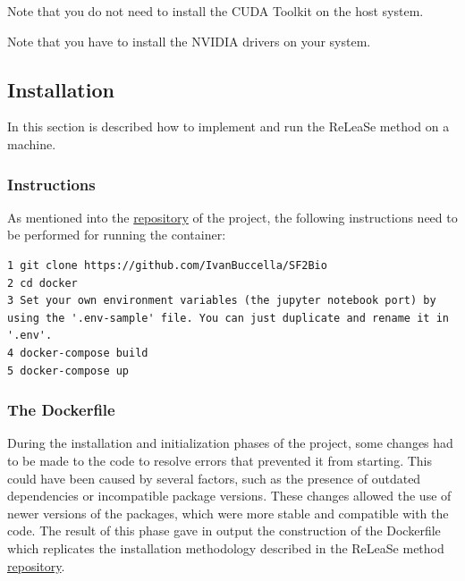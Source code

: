 \documentclass[a4paper]{article}
\begin{document}
\begin{flushleft}
Note that you do not need to install the CUDA Toolkit on the host system.

Note that you have to install the NVIDIA drivers on your system.
\end{flushleft}


\subsection{Installation}\label{sec:Installation}

In this section is described how to implement and run the ReLeaSe method on a machine.

\subsubsection{Instructions}\label{sec:Instructions}

As mentioned into the \href{https://github.com/IvanBuccella/SF2Bio#installation}{repository} of the project, the following instructions need to be performed for running the container:

\begin{lstlisting}
1 git clone https://github.com/IvanBuccella/SF2Bio
2 cd docker
3 Set your own environment variables (the jupyter notebook port) by using the '.env-sample' file. You can just duplicate and rename it in '.env'.
4 docker-compose build
5 docker-compose up
\end{lstlisting}

\subsubsection{The Dockerfile}\label{sec:The Dockerfile}

During the installation and initialization phases of the project, some changes had to be made to the code to resolve errors that prevented it from starting. This could have been caused by several factors, such as the presence of outdated dependencies or incompatible package versions. These changes allowed the use of newer versions of the packages, which were more stable and compatible with the code. 
The result of this phase gave in output the construction of the Dockerfile which replicates the installation methodology described in the ReLeaSe method \href{https://github.com/isayev/ReLeaSE#installation-with-anaconda}{repository}. 
\end{document}
